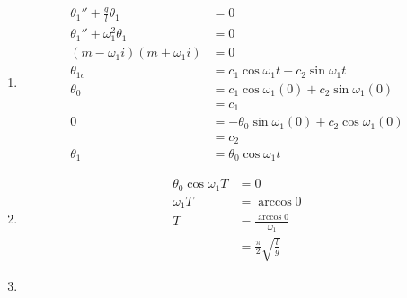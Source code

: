 \documentclass{article}
\begin{document}
\begin{enumerate}
  \item

        \begin{align*}
          \theta_1'' + \frac{g}{l} \theta_1 & = 0                                                   \\
          \theta_1'' + \omega_1^2 \theta_1  & = 0                                                   \\
          (m - \omega_1 i) (m + \omega_1 i) & = 0                                                   \\
          \theta_{1c}                       & = c_1 \cos \omega_1 t + c_2 \sin \omega_1 t           \\
          \theta_0                          & = c_1 \cos \omega_1 (0) + c_2 \sin \omega_1 (0)       \\
                                            & = c_1                                                 \\
          0                                 & = -\theta_0 \sin \omega_1 (0) + c_2 \cos \omega_1 (0) \\
                                            & = c_2                                                 \\
          \theta_1                          & = \theta_0 \cos \omega_1 t
        \end{align*}

  \item

        \begin{align*}
          \theta_0 \cos \omega_1 T & = 0                                \\
          \omega_1 T               & = \arccos 0                        \\
          T                        & = \frac{\arccos 0}{\omega_1}       \\
                                   & = \frac{\pi}{2} \sqrt{\frac{l}{g}}
        \end{align*}

  \item


\end{enumerate}
\end{document}
